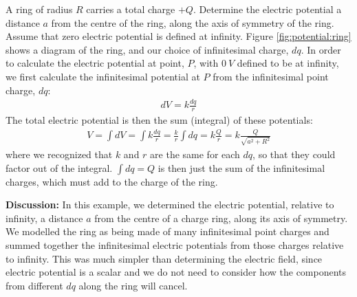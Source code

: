 \begin{example}{\label{ex:potential:ring}A ring of radius $R$ carries a total charge $+Q$. Determine the electric potential a distance $a$ from the centre of the ring, along the axis of symmetry of the ring. Assume that zero electric potential is defined at infinity.}
Figure \ref{fig:potential:ring} shows a diagram of the ring, and our choice of infinitesimal charge, $dq$. 
In order to calculate the electric potential at point, $P$, with $\SI{0}{V}$ defined to be at infinity, we first calculate the infinitesimal potential at $P$ from the infinitesimal point charge, $dq$:
\begin{align*}
dV=k\frac{dq}{r}
\end{align*}
The total electric potential is then the sum (integral) of these potentials:
\begin{align*}
V=\int dV=\int k\frac{dq}{r} = \frac{k}{r}\int dq=k\frac{Q}{r}=k\frac{Q}{\sqrt{a^2+R^2}}
\end{align*}
where we recognized that $k$ and $r$ are the same for each $dq$, so that they could factor out of the integral. $\int dq=Q$ is then just the sum of the infinitesimal charges, which must add to the charge of the ring.

\textbf{Discussion:} In this example, we determined the electric potential, relative to infinity, a distance $a$ from the centre of a charge ring, along its axis of symmetry. We modelled the ring as being made of many infinitesimal point charges and summed together the infinitesimal electric potentials from those charges relative to infinity. This was much simpler than determining the electric field, since electric potential is a scalar and we do not need to consider how the components from different $dq$ along the ring will cancel.
\end{example}

